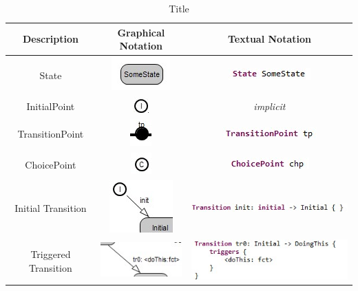 \begin{table}
\caption{Title}
\begin{tabular}{|c|c|c|}
\hline
 \textbf{Description} & \textbf{Graphical Notation} & \textbf{Textual Notation} \\ \hline
 State & \includegraphics{images/040-State.jpg} & \includegraphics[scale=0.7]{images/040-StateTextual.jpg} 
\\ \hline
 InitialPoint & \includegraphics{images/040-InitialPoint.jpg} & \textit{implicit} \\ \hline
 TransitionPoint & \includegraphics{images/040-TransitionPoint.jpg} & 
\includegraphics[scale=0.7]{images/040-TransitionPointTextual.jpg} \\ \hline
 ChoicePoint & \includegraphics{images/040-ChoicePoint.jpg} & 
\includegraphics[scale=0.7]{images/040-ChoicePointTextual.jpg} \\ \hline
 Initial Transition & \includegraphics[scale=0.7]{images/040-InitialTransition.jpg} & 
\includegraphics[scale=0.7]{images/040-InitialTransitionTextual.jpg} \\ \hline
 Triggered Transition & \includegraphics[scale=0.7]{images/040-TriggeredTransition.jpg} & 
\includegraphics[scale=0.5]{images/040-TriggeredTransitionTextual.jpg} \\ \hline
\end{tabular}
\end{table}
